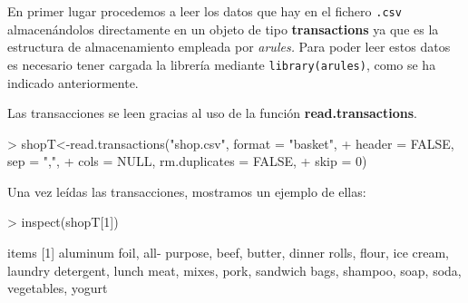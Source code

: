 \documentclass [a4paper] {article}
\begin{document}
{En primer lugar procedemos a leer los datos que hay en el fichero \texttt{.csv} almacenándolos directamente
en un objeto de tipo \textbf{transactions} ya que es la estructura de almacenamiento empleada por \textit{arules.}
Para poder leer estos datos es necesario tener cargada la librería mediante \texttt{library(arules)}, como se ha
indicado anteriormente.

Las transacciones se leen gracias al uso de la función \textbf{read.transactions}.
\begin{Schunk}
\begin{Sinput}
> shopT<-read.transactions("shop.csv", format = "basket", 
+                   header = FALSE, sep = ",", 
+                   cols = NULL, rm.duplicates = FALSE, 
+                   skip = 0)
\end{Sinput}
\end{Schunk}

\bigskip
Una vez leídas las transacciones, mostramos un ejemplo de ellas:
\begin{Schunk}
\begin{Sinput}
> inspect(shopT[1])
\end{Sinput}
\begin{Soutput}
    items              
[1] {aluminum foil,    
     all- purpose,     
     beef,             
     butter,           
     dinner rolls,     
     flour,            
     ice cream,        
     laundry detergent,
     lunch meat,       
     mixes,            
     pork,             
     sandwich bags,    
     shampoo,          
     soap,             
     soda,             
     vegetables,       
     yogurt}           
\end{Soutput}
\end{Schunk}

}
\end{document}
